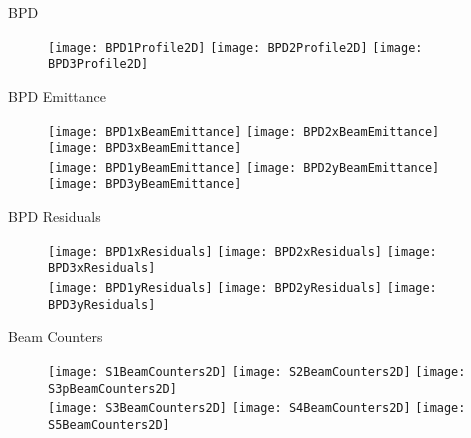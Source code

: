 \documentclass[11pt]{beamer}
\begin{document}
\begin{frame}{BPD}
\begin{figure}
\centering
\texttt{[image: BPD1Profile2D]}
\texttt{[image: BPD2Profile2D]}
\texttt{[image: BPD3Profile2D]} 
\end{figure}
\end{frame}

\begin{frame}{BPD Emittance}
\begin{figure}
\centering
\texttt{[image: BPD1xBeamEmittance]}
\texttt{[image: BPD2xBeamEmittance]}
\texttt{[image: BPD3xBeamEmittance]} \\ 
\texttt{[image: BPD1yBeamEmittance]}
\texttt{[image: BPD2yBeamEmittance]}
\texttt{[image: BPD3yBeamEmittance]} 
\end{figure}
\end{frame}

\begin{frame}{BPD Residuals}
\begin{figure}
\centering
\texttt{[image: BPD1xResiduals]}
\texttt{[image: BPD2xResiduals]}
\texttt{[image: BPD3xResiduals]} \\
\texttt{[image: BPD1yResiduals]}
\texttt{[image: BPD2yResiduals]}
\texttt{[image: BPD3yResiduals]}
\end{figure}
\end{frame} 

\begin{frame}{Beam Counters}
\begin{figure}                                                                                      
\centering                                                                                          
\texttt{[image: S1BeamCounters2D]}                                               
\texttt{[image: S2BeamCounters2D]}                                               
\texttt{[image: S3pBeamCounters2D]}\\
\texttt{[image: S3BeamCounters2D]}
\texttt{[image: S4BeamCounters2D]} 
\texttt{[image: S5BeamCounters2D]} 
\end{figure}                                                                                        
\end{frame}  
\end{document}
